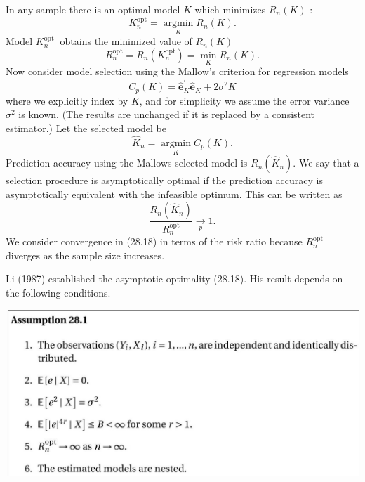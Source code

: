 \documentclass[10pt]{article}
\begin{document}
In any sample there is an optimal model $K$ which minimizes $R_{n}(K)$ :
$$
K_{n}^{\mathrm{opt}}=\underset{K}{\operatorname{argmin}} R_{n}(K) .
$$
Model $K_{n}^{\text {opt }}$ obtains the minimized value of $R_{n}(K)$
$$
R_{n}^{\mathrm{opt}}=R_{n}\left(K_{n}^{\mathrm{opt}}\right)=\min _{K} R_{n}(K) .
$$
Now consider model selection using the Mallow's criterion for regression models
$$
C_{p}(K)=\widehat{\boldsymbol{e}}_{K}^{\prime} \widehat{\boldsymbol{e}}_{K}+2 \sigma^{2} K
$$
where we explicitly index by $K$, and for simplicity we assume the error variance $\sigma^{2}$ is known. (The results are unchanged if it is replaced by a consistent estimator.) Let the selected model be
$$
\widehat{K}_{n}=\underset{K}{\operatorname{argmin}} C_{p}(K) .
$$
Prediction accuracy using the Mallows-selected model is $R_{n}\left(\widehat{K}_{n}\right)$. We say that a selection procedure is asymptotically optimal if the prediction accuracy is asymptotically equivalent with the infeasible optimum. This can be written as
$$
\frac{R_{n}\left(\widehat{K}_{n}\right)}{R_{n}^{\mathrm{opt}}} \underset{p}{\longrightarrow} 1 .
$$
We consider convergence in (28.18) in terms of the risk ratio because $R_{n}^{\text {opt }}$ diverges as the sample size increases.

Li (1987) established the asymptotic optimality (28.18). His result depends on the following conditions.

\includegraphics[max width=\textwidth]{2022_10_23_101d59f261a704807a3bg-17}
\end{document}
